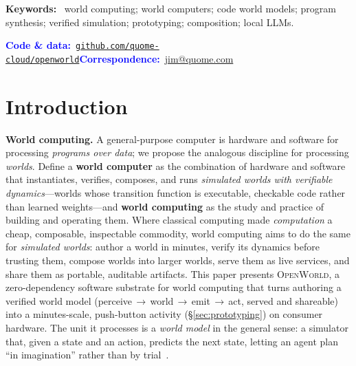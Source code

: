 \documentclass[11pt]{article}
\newcommand{\openworld}{\textsc{OpenWorld}}
\begin{document}
\begin{tcolorbox}[breakable, enhanced, colback=white, colframe=black!12,
  arc=3pt, boxrule=0.5pt, left=18pt, right=16pt, top=7pt, bottom=6pt,
  borderline west={3pt}{0pt}{cardblue}, drop fuzzy shadow=black!18]
\vspace{3pt}
\noindent\textbf{Keywords:}~%
world computing; world computers; code world models; program synthesis; verified simulation;
prototyping; composition; local LLMs.

\vspace{3pt}
\noindent\textcolor{blue}{\textbf{Code \& data:}}~\href{https://github.com/quome-cloud/openworld}{\texttt{github.com/quome-cloud/openworld}}\quad\textcolor{blue}{\textbf{Correspondence:}}~\href{mailto:jim@quome.com}{jim@quome.com}
\end{tcolorbox}
\clearpage

\section{Introduction}
\textbf{World computing.} A general-purpose computer is hardware and software for processing
\emph{programs over data}; we propose the analogous discipline for processing \emph{worlds}.
Define a \textbf{world computer} as the combination of hardware and software that instantiates,
verifies, composes, and runs \emph{simulated worlds with verifiable dynamics}---worlds whose
transition function is executable, checkable code rather than learned weights---and
\textbf{world computing} as the study and practice of building and operating them. Where
classical computing made \emph{computation} a cheap, composable, inspectable commodity, world
computing aims to do the same for \emph{simulated worlds}: author a world in minutes, verify its
dynamics before trusting them, compose worlds into larger worlds, serve them as live services,
and share them as portable, auditable artifacts. This paper presents \openworld{}, a
zero-dependency software substrate for world computing that turns authoring a verified world
model (perceive\,$\to$\,world\,$\to$\,emit\,$\to$\,act, served and shareable) into a
minutes-scale, push-button activity (\S\ref{sec:prototyping}) on consumer hardware. The unit it
processes is a \emph{world model} in the general sense: a simulator that, given a state and an action, predicts the
next state, letting an agent plan ``in imagination'' rather than by trial~\cite{ha2018world}.
\end{document}
